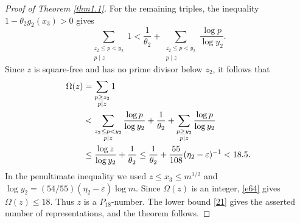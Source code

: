 \documentclass[12pt,a4paper,reqno]{amsart}
\numberwithin{equation}{section}
\theoremstyle{plain}
\theoremstyle{definition}
\begin{document}
\begin{proof}[Proof of Theorem \ref{thm1.1}]
For the remaining triples, the inequality $1-\theta_2g_2(x_3)>0$ gives
\[
\sum_{\substack{z_2\leq p<y_2\\p\mid z}}1
<
\frac1{\theta_2}
+
\sum_{\substack{z_2\leq p<y_2\\p\mid z}}
\frac{\log p}{\log y_2}.
\]
Since $z$ is square-free and has no prime divisor below $z_2$, it follows that
\begin{align}\label{e64}
\Omega(z)
&=\sum_{\substack{p\geq z_2\\ p\mid z}}1 \notag\\
&<
\sum_{\substack{z_2\leq p<y_2\\p\mid z}}
\frac{\log p}{\log y_2}
+\frac1{\theta_2}
+
\sum_{\substack{p\geq y_2\\p\mid z}}
\frac{\log p}{\log y_2} \notag\\
&\leq
\frac{\log z}{\log y_2}+\frac1{\theta_2}
\leq
\frac1{\theta_2}+\frac{55}{108}(\eta_2-\varepsilon)^{-1}
<18.5.
\end{align}
In the penultimate inequality we used $z\leq x_3\leq m^{1/2}$ and
$\log y_2=(54/55)(\eta_2-\varepsilon)\log m$. Since $\Omega(z)$ is an integer, \eqref{e64} gives $\Omega(z)\leq18$. Thus $z$ is a $P_{18}$-number. The lower bound \eqref{21} gives the asserted number of representations, and the theorem follows.
\end{proof}




	
	
    
\end{document}
